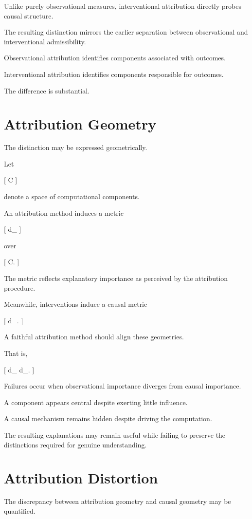\documentclass[11pt,oneside,openany]{book}
\begin{document}
Unlike purely observational measures, interventional attribution directly probes causal structure.

The resulting distinction mirrors the earlier separation between observational and interventional admissibility.

Observational attribution identifies components associated with outcomes.

Interventional attribution identifies components responsible for outcomes.

The difference is substantial.

\section{Attribution Geometry}

The distinction may be expressed geometrically.

Let

[
\mathcal C
]

denote a space of computational components.

An attribution method induces a metric

[
d_{}
]

over

[
\mathcal C.
]

The metric reflects explanatory importance as perceived by the attribution procedure.

Meanwhile, interventions induce a causal metric

[
d_{}.
]

A faithful attribution method should align these geometries.

That is,

[
d_{}
\approx
d_{}.
]

Failures occur when observational importance diverges from causal importance.

A component appears central despite exerting little influence.

A causal mechanism remains hidden despite driving the computation.

The resulting explanations may remain useful while failing to preserve the distinctions required for genuine understanding.

\section{Attribution Distortion}

The discrepancy between attribution geometry and causal geometry may be quantified.
\end{document}
